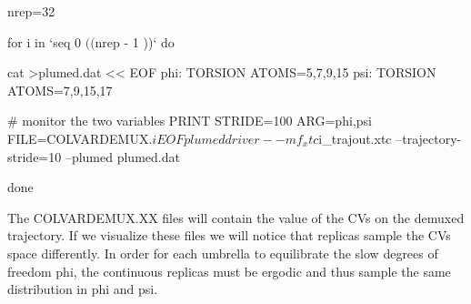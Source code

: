 \begin{DoxyVerb}nrep=32

for i in `seq 0 $(( $nrep - 1 ))`
do

cat >plumed.dat << EOF
phi: TORSION ATOMS=5,7,9,15
psi: TORSION ATOMS=7,9,15,17

# monitor the two variables
PRINT STRIDE=100 ARG=phi,psi FILE=COLVARDEMUX.$i
EOF

plumed driver --mf_xtc ${i}_trajout.xtc --trajectory-stride=10 --plumed plumed.dat

done
\end{DoxyVerb}


The C\+O\+L\+V\+A\+R\+D\+E\+M\+U\+X.\+X\+X files will contain the value of the C\+Vs on the demuxed trajectory. If we visualize these files we will notice that replicas sample the C\+Vs space differently. In order for each umbrella to equilibrate the slow degrees of freedom phi, the continuous replicas must be ergodic and thus sample the same distribution in phi and psi.

\label{munster_munster-usrem-psi-demux}%
\hypertarget{munster_munster-usrem-psi-demux}{}%
